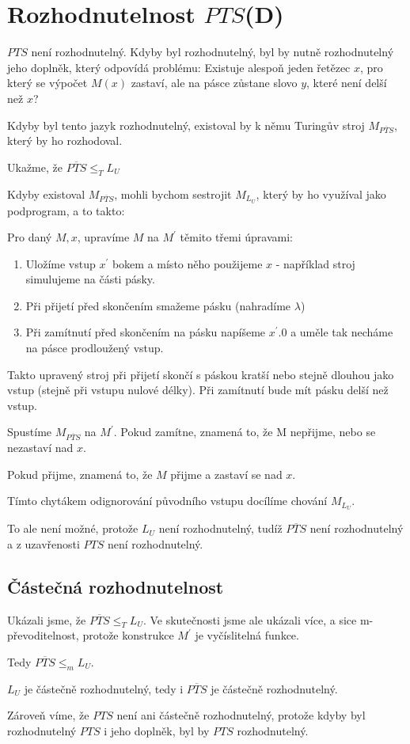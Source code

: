 \documentclass{article}
\begin{document}
\section{Rozhodnutelnost $PTS$(D)}

$PTS$ není rozhodnutelný. Kdyby byl rozhodnutelný, byl by nutně rozhodnutelný jeho doplněk, který odpovídá problému: Existuje alespoň jeden řetězec $x$, pro který se výpočet $M(x)$ zastaví, ale na pásce zůstane slovo $y$, které není delší než $x$?

Kdyby byl tento jazyk rozhodnutelný, existoval by k němu Turingův stroj $M_{\overline{PTS}}$, který by ho rozhodoval.

Ukažme, že $ \overline{PTS} \le_T L_U $

Kdyby existoval $M_{\overline{PTS}}$, mohli bychom sestrojit $M_{L_U}$, který by ho využíval jako podprogram, a to takto:

Pro daný $M, x$, upravíme $M$ na $M^\prime$ těmito třemi úpravami:

\begin{enumerate}
    \item Uložíme vstup $x^\prime$ bokem a místo něho použijeme $x$ - například stroj simulujeme na části pásky.
    \item Při přijetí před skončením smažeme pásku (nahradíme $\lambda$)
    \item Při zamítnutí před skončením na pásku napíšeme $x^\prime . 0$ a uměle tak necháme na pásce prodloužený vstup.
\end{enumerate}

Takto upravený stroj při přijetí skončí s páskou kratší nebo stejně dlouhou jako vstup (stejně při vstupu nulové délky). Při zamítnutí bude mít pásku delší než vstup.

Spustíme $M_{\overline{PTS}}$ na $M^\prime$. Pokud zamítne, znamená to, že M nepřijme, nebo se nezastaví nad $x$.

Pokud přijme, znamená to, že $M$ přijme a zastaví se nad $x$.

Tímto chytákem odignorování původního vstupu docílíme chování $M_{L_U}$.

To ale není možné, protože $L_U$ není rozhodnutelný, tudíž $\overline{PTS} $ není rozhodnutelný a z uzavřenosti $PTS$ není rozhodnutelný.

\subsection{Částečná rozhodnutelnost}

Ukázali jsme, že  $ \overline{PTS} \le_T L_U $. Ve skutečnosti jsme ale ukázali více, a sice m-převoditelnost, protože konstrukce $M^\prime$ je vyčíslitelná funkce.

Tedy  $ \overline{PTS} \le_m L_U $. 

$L_U$ je částečně rozhodnutelný, tedy i $\overline{PTS}$ je částečně rozhodnutelný.

Zároveň víme, že $PTS$ není ani částečně rozhodnutelný, protože kdyby byl rozhodnutelný $PTS$ i jeho doplněk, byl by $PTS$ rozhodnutelný.
\end{document}
